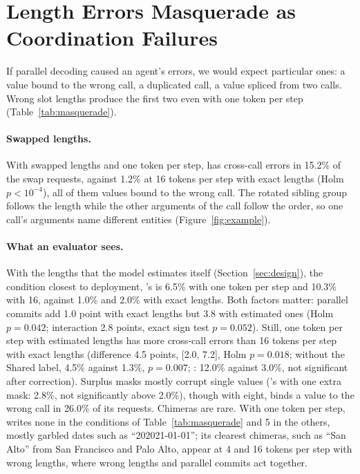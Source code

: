 \section{Length Errors Masquerade as Coordination Failures}
\label{sec:masquerade}



If parallel decoding caused an agent's errors, we would expect particular ones: a value bound to the wrong call, a duplicated call, a value spliced from two calls. Wrong slot lengths produce the first two even with one token per step (Table~\ref{tab:masquerade}).

\paragraph{Swapped lengths.} With swapped lengths and one token per step, \dream has cross-call errors in 15.2\% of the swap requests, against 1.2\% at 16 tokens per step with exact lengths (Holm $p<10^{-4}$), all of them values bound to the wrong call. The rotated sibling group follows the length while the other arguments of the call follow the order, so one call's arguments name different entities (Figure~\ref{fig:example}).

\paragraph{What an evaluator sees.} With the lengths that the model estimates itself (Section~\ref{sec:design}), the condition closest to deployment, \dream's \ccer is 6.5\% with one token per step and 10.3\% with 16, against 1.0\% and 2.0\% with exact lengths. Both factors matter: parallel commits add 1.0 point with exact lengths but 3.8 with estimated ones (Holm $p=0.042$; interaction 2.8 points, exact sign test $p=0.052$). Still, one token per step with estimated lengths has more cross-call errors than 16 tokens per step with exact lengths (difference 4.5 points, [2.0, 7.2], Holm $p=0.018$; without the Shared label, 4.5\% against 1.3\%, $p=0.007$; \llada: 12.0\% against 3.0\%, not significant after correction). Surplus masks mostly corrupt single values (\dream's \ccer with one extra mask: 2.8\%, not significantly above 2.0\%), though with eight, \llada binds a value to the wrong call in 26.0\% of its requests. Chimeras are rare. With one token per step, \dream writes none in the conditions of Table~\ref{tab:masquerade} and 5 in the others, mostly garbled dates such as ``202021-01-01''; its clearest chimeras, such as ``San Alto'' from San Francisco and Palo Alto, appear at 4 and 16 tokens per step with wrong lengths, where wrong lengths and parallel commits act together.

